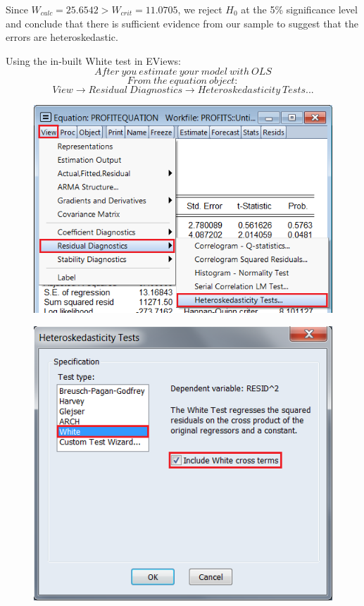 \documentclass[12pt]{report}
\begin{document}
\noindent Since $W_{calc} = 25.6542 > W_{crit} = 11.0705$, we reject $H_0$ at the 5\% significance level and conclude that there is sufficient evidence from our sample to suggest that the errors are heteroskedastic.



\noindent Using the in-built White test in EViews:
$$After\ you\ estimate\ your\ model\ with\ OLS$$
$$From\ the\ equation\ object:$$
$$View \to Residual\ Diagnostics \to Heteroskedasticity\ Tests... $$
\begin{figure}[H]
	\centering
	\includegraphics{tute10_6}
\end{figure}
\vspace{-\baselineskip}
\begin{figure}[H]
	\centering
	\includegraphics{tute9_2}
\end{figure}
\end{document}
